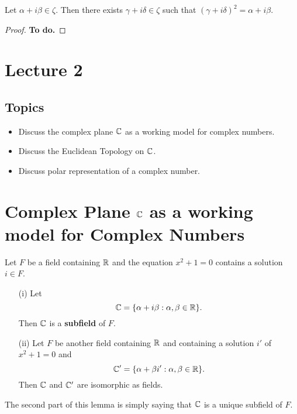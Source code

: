 \documentclass[a4paper]{report}
\begin{document}
\begin{lemma}
    Let \(\alpha + i \beta \in \zeta \). Then there exists \( \gamma + i \delta \in \zeta  \) such that \( (\gamma + i \delta)^{2} = \alpha + i \beta \).
\end{lemma}
\begin{proof}
    \textbf{To do.}
\end{proof}

\section{Lecture 2}

\subsection{Topics}

\begin{itemize}
    \item Discuss the complex plane \( \mathbb{C}  \) as a working model for complex numbers.
    \item Discuss the Euclidean Topology on \( \mathbb{C}  \).
    \item Discuss polar representation of a complex number.
\end{itemize}

\section{Complex Plane \( \mathbb{C}  \) as a working model for Complex Numbers}
\begin{lemma}
  Let \( F  \) be a field containing \( \mathbb{R}  \) and the equation \( x^{2} + 1  =0 \) contains a solution \( i \in F  \).
\begin{enumerate}
    \item[(i)] Let   
  \[  \mathbb{C} = \{ \alpha + i \beta : \alpha, \beta \in \mathbb{R}  \}. \]
  Then \( \mathbb{C}  \) is a \textbf{subfield} of \( F  \).
    \item[(ii)] Let \( F  \) be another field containing \( \mathbb{R}  \) and containing a solution \( i' \) of \( x^{2} + 1 = 0   \) and
        \[  \mathbb{C}' = \{ \alpha + \beta i' : \alpha, \beta \in \mathbb{R}  \}.  \]
        Then \( \mathbb{C}  \) and \( \mathbb{C}' \) are isomorphic as fields.
\end{enumerate}
\end{lemma}

The second part of this lemma is simply saying that \( \mathbb{C}  \) is a unique subfield of \( F  \).
\end{document}
